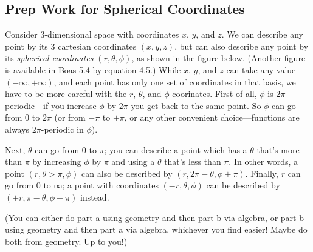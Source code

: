 \documentclass[answers]{exam}\newcommand{\repositoryInformationSetup}{     \usepackage[dvipsnames]{xcolor}     \usepackage[ angle=90, color=black, opacity=1, scale=2, ]{background}      \SetBgPosition{current page.west}      \SetBgVshift{-4.5mm}      \backgroundsetup{contents={{\color{green}\texttt{-{}-} differs from commit \texttt{aac605f} in 0 files}}} } \newcommand{\commit}{{{\color{green}aac605f}}}\usepackage{amsmath}
\begin{document}
\begin{questions}
	\section*{Prep Work for Spherical Coordinates}
	\question Consider 3-dimensional space with coordinates $x$, $y$, and $z$.  We can describe any point by its 3 cartesian coordinates $(x, y, z)$, but can also describe any point by its \emph{spherical coordinates} $(r, \theta, \phi)$, as shown in the figure below.
	(Another figure is available in Boas 5.4 by equation 4.5.)
	While $x$, $y$, and $z$ can take any value $(-\infty,+\infty)$, and each point has only one set of coordinates in that basis, we have to be more careful with the $r$, $\theta$, and $\phi$ coorinates.  First of all, $\phi$ is $2\pi$-periodic---if you increase $\phi$ by $2\pi$ you get back to the same point.  So $\phi$ can go from 0 to $2\pi$ (or from $-\pi$ to $+\pi$, or any other convenient choice---functions are always $2\pi$-periodic in $\phi$).

	Next, $\theta$ can go from 0 to $\pi$; you can describe a point which has a $\theta$ that's more than $\pi$ by increasing $\phi$ by $\pi$ and using a $\theta$ that's less than $\pi$.  In other words, a point $(r, \theta > \pi, \phi)$ can also be described by $(r, 2\pi-\theta, \phi+\pi)$.
	Finally, $r$ can go from 0 to $\infty$; a point with coordinates $(-r,\theta,\phi)$ can be described by $(+r, \pi-\theta, \phi+\pi)$ instead.

	(You can either do part a using geometry and then part b via algebra, or part b using geometry and then part a via algebra, whichever you find easier!  Maybe do both from geometry.  Up to you!)
\end{questions}
\end{document}
